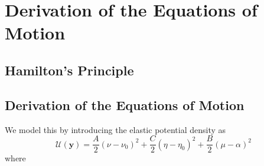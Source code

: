 \documentclass[12pt]{article}
\newcommand{\cB}{B}
\newcommand{\cA}{A}
\newcommand{\cC}{C}
\begin{document}
\section{Derivation of the Equations of Motion
}\label{Derivation of the Equations of Motion
}
\subsection{Hamilton's Principle}
\subsection{Derivation of the Equations of Motion}

We model this by introducing the elastic potential density as
\[ \mathcal{U}(\textbf {y}) = \frac{\cA}{2} (\nu - \nu_0)^2
+\frac{\cC}{2} (\eta - \eta_0 )^2
+\frac{\cB}{2} (\mu -\alpha)^2 
\]
where
\end{document}
